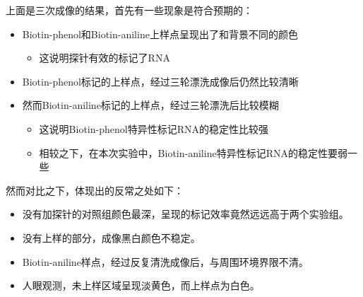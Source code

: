\documentclass[UTF-8]{ctexart}
\begin{document}
上面是三次成像的结果，首先有一些现象是符合预期的：
\begin{itemize}
    \item Biotin-phenol和Biotin-aniline上样点呈现出了和背景不同的颜色
    \begin{itemize}
        \item 这说明探针有效的标记了RNA
    \end{itemize}
    \item Biotin-phenol标记的上样点，经过三轮漂洗成像后仍然比较清晰
    \item 然而Biotin-aniline标记的上样点，经过三轮漂洗后比较模糊
    \begin{itemize}
        \item 这说明Biotin-phenol特异性标记RNA的稳定性比较强
        \item 相较之下，在本次实验中，Biotin-aniline特异性标记RNA的稳定性要弱一些
    \end{itemize}
\end{itemize}

然而对比之下，体现出的反常之处如下：
\begin{itemize}
    \item 没有加探针的对照组颜色最深，呈现的标记效率竟然远远高于两个实验组。
    \item 没有上样的部分，成像黑白颜色不稳定。
    \item Biotin-aniline样点，经过反复清洗成像后，与周围环境界限不清。
    \item 人眼观测，未上样区域呈现淡黄色，而上样点为白色。
\end{itemize}
\end{document}

